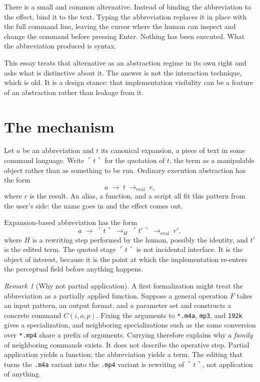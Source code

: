 \documentclass[11pt]{article}
\theoremstyle{remark}
\newtheorem{remark}{Remark}
\newcommand{\ql}{\ulcorner}
\newcommand{\qr}{\urcorner}
\newcommand{\quo}[1]{\ql #1\qr}
\newcommand{\cmd}[1]{\texttt{#1}}
\begin{document}
There is a small and common alternative. Instead of binding the abbreviation to the effect, bind it to the text. Typing the abbreviation replaces it in place with the full command line, leaving the cursor where the human can inspect and change the command before pressing Enter. Nothing has been executed. What the abbreviation produced is syntax.

This essay treats that alternative as an abstraction regime in its own right and asks what is distinctive about it. The answer is not the interaction technique, which is old. It is a design stance: that implementation visibility can be a feature of an abstraction rather than leakage from it.

\section{The mechanism}

Let $a$ be an abbreviation and $t$ its canonical expansion, a piece of text in some command language. Write $\quo{t}$ for the quotation of $t$, the term as a manipulable object rather than as something to be run. Ordinary execution abstraction has the form
\[
a \;\longrightarrow\; t \;\longrightarrow_{\mathrm{eval}}\; r,
\]
where $r$ is the result. An alias, a function, and a script all fit this pattern from the user's side: the name goes in and the effect comes out.

Expansion-based abbreviation has the form
\[
a \;\longrightarrow\; \quo{t} \;\longrightarrow_{H}\; \quo{t'} \;\longrightarrow_{\mathrm{eval}}\; r',
\]
where $H$ is a rewriting step performed by the human, possibly the identity, and $t'$ is the edited term. The quoted stage $\quo{t}$ is not incidental interface. It is the object of interest, because it is the point at which the implementation re-enters the perceptual field before anything happens.

\begin{remark}[Why not partial application]
A first formalization might treat the abbreviation as a partially applied function. Suppose a general operation $F$ takes an input pattern, an output format, and a parameter set and constructs a concrete command $C(i,o,p)$. Fixing the arguments to \cmd{*.m4a}, \cmd{mp3}, and \cmd{192k} gives a specialization, and neighboring specializations such as the same conversion over \cmd{*.mp4} share a prefix of arguments. Currying therefore explains why a \emph{family} of neighboring commands exists. It does not describe the operative step. Partial application yields a function; the abbreviation yields a term. The editing that turns the \cmd{.m4a} variant into the \cmd{.mp4} variant is rewriting of $\quo{t}$, not application of anything.
\end{remark}
\end{document}
